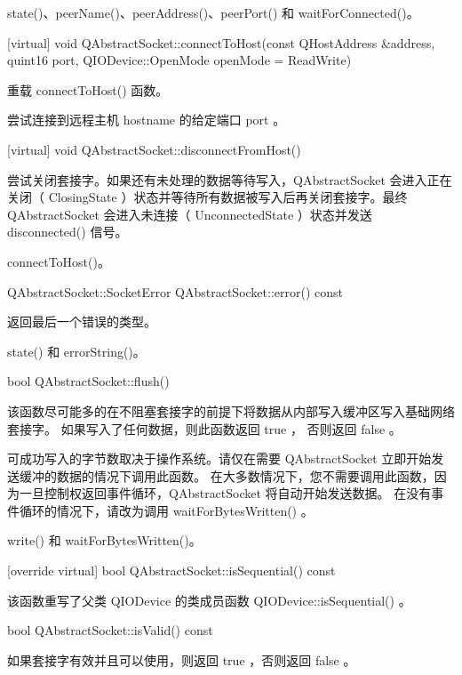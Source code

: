 \begin{notice}[另请查阅]
state()、peerName()、peerAddress()、peerPort() 和 waitForConnected()。
\end{notice}


[virtual] void QAbstractSocket::connectToHost(const QHostAddress
\&address, quint16 port, QIODevice::OpenMode openMode = ReadWrite)

重载 connectToHost() 函数。

尝试连接到远程主机 hostname 的给定端口 port 。

[virtual] void QAbstractSocket::disconnectFromHost()

尝试关闭套接字。如果还有未处理的数据等待写入，QAbstractSocket 会进入正在关闭（ ClosingState ）状态并等待所有数据被写入后再关闭套接字。最终 QAbstractSocket 会进入未连接（ UnconnectedState ）状态并发送 disconnected() 信号。


\begin{notice}[另请查阅]
connectToHost()。
\end{notice}


QAbstractSocket::SocketError QAbstractSocket::error() const

返回最后一个错误的类型。


\begin{notice}[另请查阅]
 state() 和 errorString()。
\end{notice}


bool QAbstractSocket::flush()

该函数尽可能多的在不阻塞套接字的前提下将数据从内部写入缓冲区写入基础网络套接字。 如果写入了任何数据，则此函数返回 true ， 否则返回 false 。

可成功写入的字节数取决于操作系统。请仅在需要 QAbstractSocket 立即开始发送缓冲的数据的情况下调用此函数。 在大多数情况下，您不需要调用此函数，因为一旦控制权返回事件循环，QAbstractSocket 将自动开始发送数据。 在没有事件循环的情况下，请改为调用 waitForBytesWritten() 。



\begin{notice}[另请查阅]
 write() 和 waitForBytesWritten()。
\end{notice}

[override virtual] bool QAbstractSocket::isSequential() const

该函数重写了父类 QIODevice 的类成员函数 QIODevice::isSequential() 。

bool QAbstractSocket::isValid() const

如果套接字有效并且可以使用，则返回 true ，否则返回 false 。


